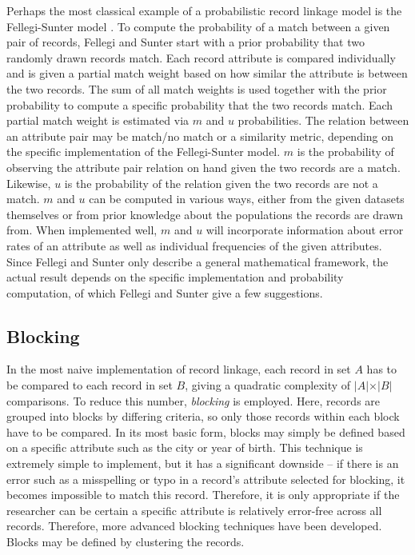 Perhaps the most classical example of a probabilistic record linkage model is the Fellegi-Sunter model \cite{fellegiTheoryRecordLinkage1969a}.
To compute the probability of a  match between a given pair of records, Fellegi and Sunter start with a prior probability that two randomly drawn records match.
Each record attribute is compared individually and is given a partial match weight based on how similar the attribute is between the two records.
The sum of all match weights is used together with the prior probability to compute a specific probability that the two records match.
Each partial match weight is estimated via $m$ and $u$ probabilities.
The relation between an attribute pair may be match/no match or a similarity metric, depending on the specific implementation of the Fellegi-Sunter model.
$m$ is the probability of observing the attribute pair relation on hand given the two records are a match.
Likewise, $u$ is the probability of the relation given the two records are not a match.
$m$ and $u$ can be computed in various ways, either from the given datasets themselves or from prior knowledge about the populations the records are drawn from.
When implemented well, $m$ and $u$ will incorporate information about error rates of an attribute as well as individual frequencies of the given attributes.
Since Fellegi and Sunter only describe a general mathematical framework, the actual result depends on the specific implementation and probability computation, of which Fellegi and Sunter give a few suggestions.
\subsection{Blocking}
In the most naive implementation of record linkage, each record in set $A$ has to be compared to each record in set $B$, giving a quadratic complexity of $\vert A\vert \times \vert B \vert$ comparisons.
To reduce this number, \textit{blocking} is employed.
Here, records are grouped into blocks by differing criteria, so only those records within each block have to be compared.
In its most basic form, blocks may simply be defined based on a specific attribute such as the city or year of birth.
This technique is extremely simple to implement, but it has a significant downside
-- if there is an error such as a misspelling or typo in a record's attribute selected for blocking, it becomes impossible to match this record.
Therefore, it is only appropriate if the researcher can be certain a specific attribute is relatively error-free across all records.
Therefore, more advanced blocking techniques have been developed.
Blocks may be defined by clustering the records.

